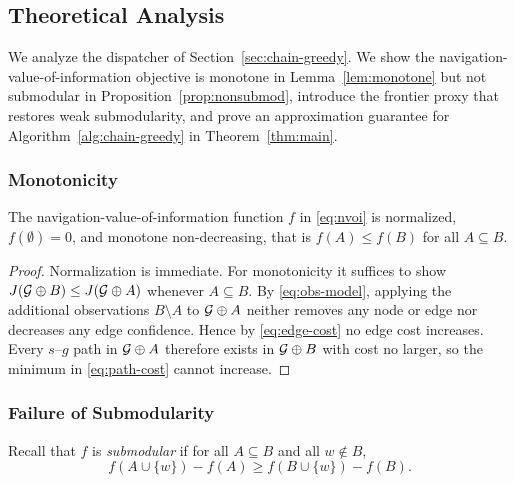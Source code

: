 \subsection{Theoretical Analysis}
\label{sec:theory}

We analyze the dispatcher of Section~\ref{sec:chain-greedy}. We show the navigation-value-of-information objective is monotone in Lemma~\ref{lem:monotone} but not submodular in Proposition~\ref{prop:nonsubmod}, introduce the frontier proxy that restores weak submodularity, and prove an approximation guarantee for Algorithm~\ref{alg:chain-greedy} in Theorem~\ref{thm:main}.

\subsubsection{Monotonicity}

\begin{lemma}[Monotonicity]
\label{lem:monotone}
The navigation-value-of-information function $f$ in \eqref{eq:nvoi} is normalized, $f(\emptyset) = 0$, and monotone non-decreasing, that is $f(A) \leq f(B)$ for all $A \subseteq B$.
\end{lemma}

\begin{proof}
Normalization is immediate. For monotonicity it suffices to show $J(\mathcal{G} \oplus B) \leq J(\mathcal{G} \oplus A)$ whenever $A \subseteq B$. By \eqref{eq:obs-model}, applying the additional observations $B \setminus A$ to $\mathcal{G} \oplus A$ neither removes any node or edge nor decreases any edge confidence. Hence by \eqref{eq:edge-cost} no edge cost increases. Every $s$--$g$ path in $\mathcal{G} \oplus A$ therefore exists in $\mathcal{G} \oplus B$ with cost no larger, so the minimum in \eqref{eq:path-cost} cannot increase.
\end{proof}

\subsubsection{Failure of Submodularity}

Recall that $f$ is \emph{submodular} if for all $A \subseteq B$ and all $w \notin B$,
\begin{equation} f(A \cup \{w\}) - f(A) \geq f(B \cup \{w\}) - f(B). \label{eq:submod} \end{equation}

